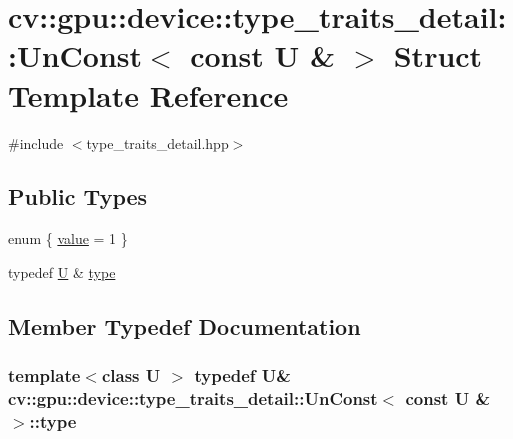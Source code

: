 \hypertarget{structcv_1_1gpu_1_1device_1_1type__traits__detail_1_1UnConst_3_01const_01U_01_6_01_4}{\section{cv\-:\-:gpu\-:\-:device\-:\-:type\-\_\-traits\-\_\-detail\-:\-:Un\-Const$<$ const U \& $>$ Struct Template Reference}
\label{structcv_1_1gpu_1_1device_1_1type__traits__detail_1_1UnConst_3_01const_01U_01_6_01_4}
}


{\ttfamily \#include $<$type\-\_\-traits\-\_\-detail.\-hpp$>$}

\subsection*{Public Types}
\begin{DoxyCompactItemize}
\item 
enum \{ \hyperlink{structcv_1_1gpu_1_1device_1_1type__traits__detail_1_1UnConst_3_01const_01U_01_6_01_4_afe43ab38b7a8bbfa0510e1186b0dfadda87e5b8a6352754fa88e84df6c6626c6d}{value} = 1
 \}
\item 
typedef \hyperlink{core__c_8h_aa9c521f41af9a5191e5e4b6ffbae211a}{U} \& \hyperlink{structcv_1_1gpu_1_1device_1_1type__traits__detail_1_1UnConst_3_01const_01U_01_6_01_4_a8f83b5688dd0c842f8ffa57a7891fca1}{type}
\end{DoxyCompactItemize}


\subsection{Member Typedef Documentation}
\hypertarget{structcv_1_1gpu_1_1device_1_1type__traits__detail_1_1UnConst_3_01const_01U_01_6_01_4_a8f83b5688dd0c842f8ffa57a7891fca1}{
\subsubsection[{type}]{\setlength{\rightskip}{0pt plus 5cm}template$<$class U $>$ typedef {\bf U}\& {\bf cv\-::gpu\-::device\-::type\-\_\-traits\-\_\-detail\-::\-Un\-Const}$<$ const {\bf U} \& $>$\-::{\bf type}}}\label{structcv_1_1gpu_1_1device_1_1type__traits__detail_1_1UnConst_3_01const_01U_01_6_01_4_a8f83b5688dd0c842f8ffa57a7891fca1}


